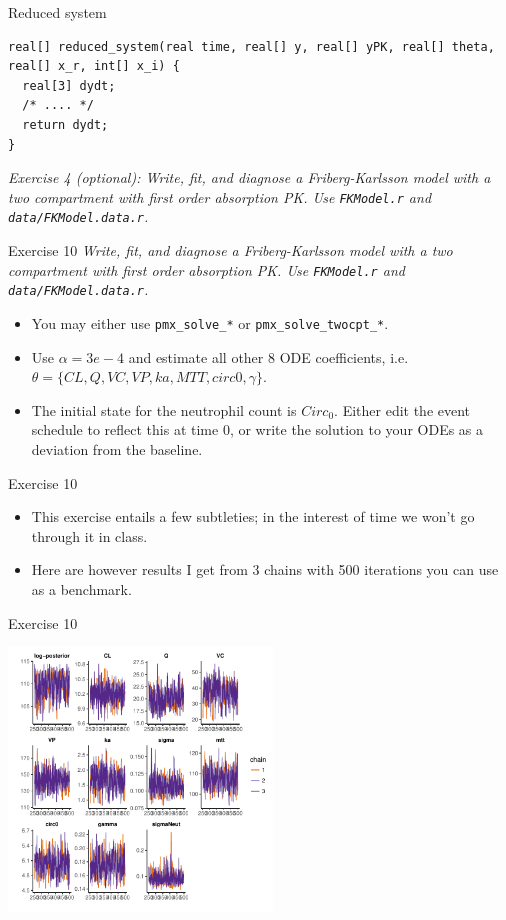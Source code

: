 \documentclass[presentation, allowframebreaks]{beamer}
\begin{document}
\begin{frame}[fragile,label={sec:org76c394f}]{Reduced system}
 \begin{verbatim}
real[] reduced_system(real time, real[] y, real[] yPK, real[] theta, real[] x_r, int[] x_i) {
  real[3] dydt;
  /* .... */
  return dydt;
}
\end{verbatim}
\emph{\textcolor{MRGGreen}{Exercise 4 (optional)}: Write, fit, and diagnose a Friberg-Karlsson model with a two compartment with first order absorption PK. Use \texttt{FKModel.r} and \texttt{data/FKModel.data.r}.}
\end{frame}
\begin{frame}[label={sec:orgca114a5}]{Exercise 10}
\emph{Write, fit, and diagnose a Friberg-Karlsson model with a two compartment with first order absorption PK. Use \texttt{FKModel.r} and \texttt{data/FKModel.data.r}.}
\begin{itemize}
\item You may either use \texttt{pmx\_solve\_*} or \texttt{pmx\_solve\_twocpt\_*}.
\item Use \(\alpha = 3e-4\) and estimate all other 8 ODE coefficients,
i.e. \(\theta = \{ CL, Q, VC, VP, ka, MTT, circ0, \gamma \}\).
\item The initial state for the neutrophil count is \(Circ_0\). 
Either edit the event schedule to reflect this at time 0, 
or write the solution to your ODEs as a deviation from the baseline.
\end{itemize}
\end{frame}
\begin{frame}[label={sec:org637db3b}]{Exercise 10}
\begin{itemize}
\item This exercise entails a few subtleties; in the interest of time we won't go through it in class.
\item Here are however results I get from 3 chains with 500 iterations you can use as a benchmark.
\end{itemize}
\end{frame}
\begin{frame}[label={sec:org3f89b73}]{Exercise 10}
\begin{center}
  \includegraphics[width=7cm]{FKModelPlots002.pdf}
\end{center}
\end{frame}
\end{document}
